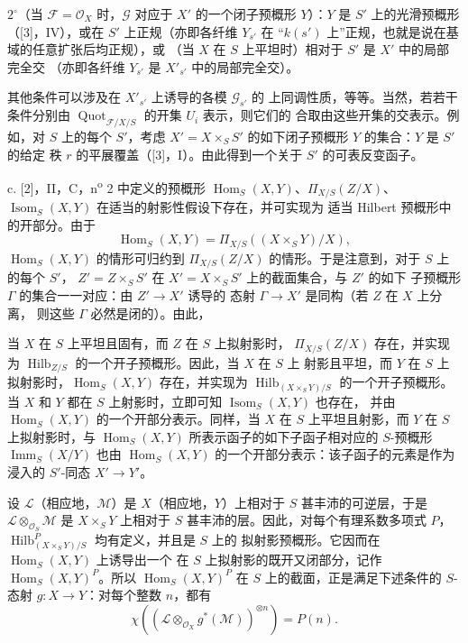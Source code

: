 \smallskip
\noindent $2^\circ$（当 $\mathcal F=\mathcal O_X$ 时，$\mathcal G$
对应于 $X'$ 的一个闭子预概形 $Y$）：$Y$ 是 $S'$ 上的光滑预概形
（[3]，IV），或在 $S'$ 上正规（亦即各纤维 $Y_{s'}$ 在
“$k(s')$ 上”正规，也就是说在基域的任意扩张后均正规），或
（当 $X$ 在 $S$ 上平坦时）相对于 $S'$ 是 $X'$ 中的局部完全交
（亦即各纤维 $Y_{s'}$ 是 $X'_{s'}$ 中的局部完全交）。

其他条件可以涉及在 $X'_{s'}$ 上诱导的各模 $\mathcal G_{s'}$ 的
上同调性质，等等。当然，若若干条件分别由
$\operatorname{Quot}_{\mathcal F/X/S}$ 的开集 $U_i$ 表示，则它们的
合取由这些开集的交表示。例如，对 $S$ 上的每个 $S'$，考虑
$X'=X\times_SS'$ 的如下闭子预概形 $Y$ 的集合：$Y$ 是 $S'$ 的给定
秩 $r$ 的平展覆盖（[3]，I）。由此得到一个关于 $S'$ 的可表反变函子。

\medskip
\noindent c. [2]，II，C，n\textsuperscript{o} 2 中定义的预概形
$\operatorname{Hom}_S(X,Y)$、$\Pi_{X/S}(Z/X)$、
$\operatorname{Isom}_S(X,Y)$ 在适当的射影性假设下存在，并可实现为
适当 Hilbert 预概形中的开部分。由于
\[
\operatorname{Hom}_S(X,Y)=\Pi_{X/S}((X\times_SY)/X),
\]
$\operatorname{Hom}_S(X,Y)$ 的情形可归约到
$\Pi_{X/S}(Z/X)$ 的情形。于是注意到，对于 $S$ 上的每个 $S'$，
$Z'=Z\times_SS'$ 在 $X'=X\times_SS'$ 上的截面集合，与 $Z'$ 的如下
子预概形 $\Gamma$ 的集合一一对应：由 $Z'\longrightarrow X'$ 诱导的
态射 $\Gamma\longrightarrow X'$ 是同构（若 $Z$ 在 $X$ 上分离，
则这些 $\Gamma$ 必然是闭的）。由此，

当 $X$ 在 $S$ 上平坦且固有，而 $Z$ 在 $S$ 上拟射影时，
$\Pi_{X/S}(Z/X)$ 存在，并实现为
$\operatorname{Hilb}_{Z/S}$ 的一个开子预概形。因此，当 $X$ 在 $S$ 上
射影且平坦，而 $Y$ 在 $S$ 上拟射影时，$\operatorname{Hom}_S(X,Y)$
存在，并实现为
$\operatorname{Hilb}_{(X\times_SY)/S}$ 的一个开子预概形。当 $X$ 和
$Y$ 都在 $S$ 上射影时，立即可知 $\operatorname{Isom}_S(X,Y)$ 也存在，
并由 $\operatorname{Hom}_S(X,Y)$ 的一个开部分表示。同样，当 $X$ 在
$S$ 上平坦且射影，而 $Y$ 在 $S$ 上拟射影时，与
$\operatorname{Hom}_S(X,Y)$ 所表示函子的如下子函子相对应的
$S$-预概形 $\operatorname{Imm}_S(X/Y)$ 也由
$\operatorname{Hom}_S(X,Y)$ 的一个开部分表示：该子函子的元素是作为
浸入的 $S'$-同态 $X'\longrightarrow Y'$。

设 $\mathcal L$（相应地，$\mathcal M$）是 $X$（相应地，$Y$）上相对于
$S$ 甚丰沛的可逆层，于是
$\mathcal L\otimes_{\mathcal O_S}\mathcal M$ 是 $X\times_SY$ 上相对于
$S$ 甚丰沛的层。因此，对每个有理系数多项式 $P$，
$\operatorname{Hilb}^P_{(X\times_SY)/S}$ 均有定义，并且是 $S$ 上的
拟射影预概形。它因而在 $\operatorname{Hom}_S(X,Y)$ 上诱导出一个
在 $S$ 上拟射影的既开又闭部分，记作
$\operatorname{Hom}_S(X,Y)^P$。所以
$\operatorname{Hom}_S(X,Y)^P$ 在 $S$ 上的截面，正是满足下述条件的
$S$-态射 $g:X\longrightarrow Y$：对每个整数 $n$，都有
\[
\chi\!\left(\left(\mathcal L\otimes_{\mathcal O_X}g^*(\mathcal M)\right)^{
\otimes n}\right)=P(n).
\]

